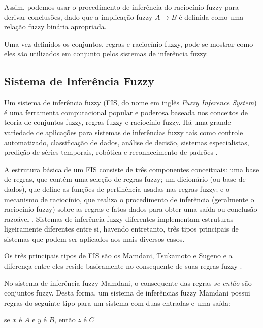 Assim, podemos usar o procedimento de inferência do raciocínio fuzzy para derivar conclusões, dado que a implicação fuzzy $A \rightarrow B$ é definida como uma relação fuzzy binária apropriada.

Uma vez definidos os conjuntos, regras e raciocínio fuzzy, pode-se mostrar como eles são utilizados em conjunto pelos sistemas de inferência fuzzy.
 
\subsection{Sistema de Inferência Fuzzy}
\label{sec:sistema_inferencai_fuzzy}

Um sistema de inferência fuzzy (FIS, do nome em inglês \textit{Fuzzy Inference System}) é uma ferramenta computacional popular e poderosa baseada nos conceitos de teoria de conjuntos fuzzy, regras fuzzy e raciocínio fuzzy. Há uma grande variedade de aplicações para sistemas de inferências fuzzy tais como controle automatizado, classificação de dados, análise de decisão, sistemas especialistas, predição de séries temporais, robótica e reconhecimento de padrões \cite[p.~73]{Jang1997}.

A estrutura básica de um FIS consiste de três componentes conceituais: uma base de regras, que contém uma seleção de regras fuzzy; um dicionário (ou base de dados), que define as funções de pertinência usadas nas regras fuzzy; e o mecanismo de raciocínio, que realiza o procedimento de inferência (geralmente o raciocínio fuzzy) sobre as regras e fatos dados para obter uma saída ou conclusão razoável \cite[p.~73]{Jang1997}. Sistemas de inferência fuzzy diferentes implementam estruturas ligeiramente diferentes entre si, havendo entretanto, três tipos principais de sistemas que podem ser aplicados aos mais diversos casos.

Os três principais tipos de FIS são os Mamdani, Tsukamoto e Sugeno e a diferença entre eles reside basicamente no consequente de suas regras fuzzy \cite[p.~74]{Jang1997}.

No sistema de inferência fuzzy Mamdani, o consequente das regras \textit{se-então} são conjuntos fuzzy. Desta forma, um sistema de inferências fuzzy Mamdani possui regras do seguinte tipo para um sistema com duas entradas e uma saída:
\begin{center}
se $x$ é $A$ e $y$ é $B$, então $z$ é $C$
\end{center}

